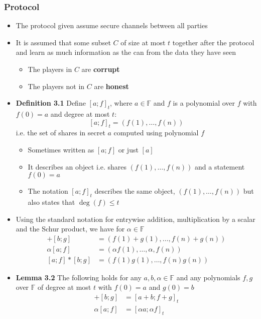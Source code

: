 \subsubsection{Protocol}
\begin{itemize}
  \item The protocol given assume secure channels between all parties
  \item It is assumed that some subset $C$ of size at most $t$ together after the protocol and learn as much information as the can from the data they have seen
  \begin{itemize}
  	\item The players in $C$ are \textbf{corrupt}
  	\item The players not in $C$ are \textbf{honest}
  \end{itemize}
  \item \textbf{Definition 3.1} Define $[a;f]_t$, where $a \in \mathbb F$ and $f$ is a polynomial over $f$ with $f(0) = a$ and degree at most $t$:
  \[
    [a;f]_t = (f(1), \dots, f(n))
  \]
  i.e. the set of shares in secret $a$ computed using polynomial $f$
  \begin{itemize}
  	\item Sometimes written as $[a;f]$ or just $[a]$
  	\item It describes an object i.e. shares $(f(1), \dots, f(n))$ and a statement $f(0) = a$
  	\item The notation $[a;f]_t$ describes the same object, $(f(1), \dots, f(n))$ but also states that $\deg(f) \leq t$
  \end{itemize}
  \item Using the standard notation for entrywise addition, multiplication by a scalar and the Schur product, we have for $\alpha \in \mathbb F$
  \begin{align*}
    [a;f] + [b;g] &= (f(1) + g(1), \dots, f(n) + g(n)) \\
    \alpha[a;f] &= (\alpha f(1), \dots, \alpha,f(n)) \\
    [a;f] * [b;g] &= (f(1)g(1), \dots, f(n)g(n))
  \end{align*}	
  \item \textbf{Lemma 3.2} The following holds for any $a,b,\alpha \in \mathbb F$ and any polynomials $f,g$ over $\mathbb F$ of degree at most $t$ with $f(0) = a$ and $g(0) = b$
  \begin{align*}
    [a;f] + [b;g] &= [a+b ; f + g]_t \\
      \alpha[a;f] &= [\alpha a; \alpha f]_t \\

\end{align*}
\end{itemize}
